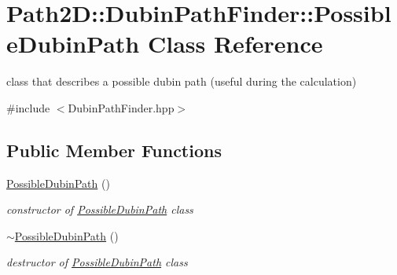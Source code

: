\hypertarget{class_path2_d_1_1_dubin_path_finder_1_1_possible_dubin_path}{}\section{Path2D\+:\+:Dubin\+Path\+Finder\+:\+:Possible\+Dubin\+Path Class Reference}
\label{class_path2_d_1_1_dubin_path_finder_1_1_possible_dubin_path}


class that describes a possible dubin path (useful during the calculation)  




{\ttfamily \#include $<$Dubin\+Path\+Finder.\+hpp$>$}

\subsection*{Public Member Functions}
\begin{DoxyCompactItemize}
\item 
\mbox{\label{class_path2_d_1_1_dubin_path_finder_1_1_possible_dubin_path_a5ab9b2e9351f032edbadffa73f53318d}} 
\mbox{\hyperlink{class_path2_d_1_1_dubin_path_finder_1_1_possible_dubin_path_a5ab9b2e9351f032edbadffa73f53318d}{Possible\+Dubin\+Path}} ()
\begin{DoxyCompactList}\small\item\em constructor of \mbox{\hyperlink{class_path2_d_1_1_dubin_path_finder_1_1_possible_dubin_path}{Possible\+Dubin\+Path}} class \end{DoxyCompactList}\item 
\mbox{\label{class_path2_d_1_1_dubin_path_finder_1_1_possible_dubin_path_a0d7f0210884a2e9d4c24823d9b129b21}} 
\mbox{\hyperlink{class_path2_d_1_1_dubin_path_finder_1_1_possible_dubin_path_a0d7f0210884a2e9d4c24823d9b129b21}{$\sim$\+Possible\+Dubin\+Path}} ()
\begin{DoxyCompactList}\small\item\em destructor of \mbox{\hyperlink{class_path2_d_1_1_dubin_path_finder_1_1_possible_dubin_path}{Possible\+Dubin\+Path}} class \end{DoxyCompactList}\end{DoxyCompactItemize}
